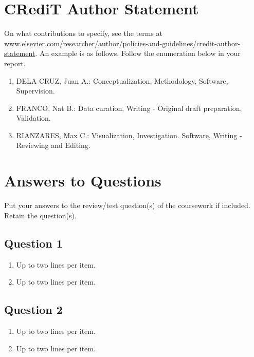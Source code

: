 \section{CRediT Author Statement}

On what contributions to specify, see the terms at \url{www.elsevier.com/researcher/author/policies-and-guidelines/credit-author-statement}.  An example is as follows.  Follow the enumeration below in your report.

\begin{enumerate}
	\item DELA CRUZ, Juan A.: Conceptualization, Methodology, Software, Supervision.
	
	\item FRANCO, Nat B.: Data curation, Writing - Original draft preparation, Validation.
	
	\item RIANZARES, Max C.: Visualization, Investigation. Software, Writing - Reviewing and Editing.
\end{enumerate}














\section{Answers to Questions}
\label{sec:ans2ques}

Put your answers to the review/test question(s) of the coursework if included.  Retain the question(s). 

\subsection{Question 1}  
\begin{enumerate}
\item Up to two lines per item.
\item Up to two lines per item.
\end{enumerate}	
	
\subsection{Question 2}  
\begin{enumerate}
\item Up to two lines per item.
\item Up to two lines per item.
\end{enumerate}
	
